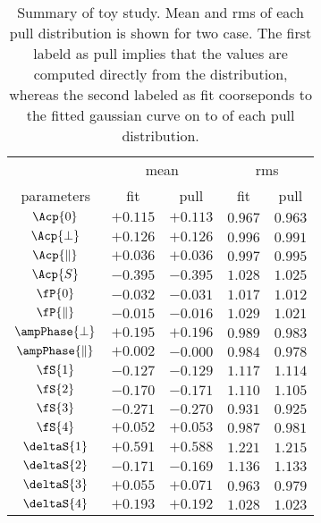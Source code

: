 \begin{table}
  \centering
  \begin{tabular}{c c c c c }
    \cline{2-5}
               & \multicolumn{2}{c}{mean} & \multicolumn{2}{c}{rms} \\
    \cline{2-5}
    parameters & fit & pull & fit & pull \\ %
    \cline{1-5}
    $\Acp{0}$              & $+0.115$ & $+0.113$ & $0.967$ & $0.963$ \\
    $\Acp{\perp}$          & $+0.126$ & $+0.126$ & $0.996$ & $0.991$ \\
    $\Acp{\parallel}$      & $+0.036$ & $+0.036$ & $0.997$ & $0.995$ \\
    $\Acp{S}$              & $-0.395$ & $-0.395$ & $1.028$ & $1.025$ \\
    \hline                                                          
    $\fP{0}$               & $-0.032$ & $-0.031$ & $1.017$ & $1.012$ \\
    $\fP{\parallel}$       & $-0.015$ & $-0.016$ & $1.029$ & $1.021$ \\
    $\ampPhase{\perp}$     & $+0.195$ & $+0.196$ & $0.989$ & $0.983$ \\
    $\ampPhase{\parallel}$ & $+0.002$ & $-0.000$ & $0.984$ & $0.978$ \\
    \hline                                                          
    $\fS{1}$               & $-0.127$ & $-0.129$ & $1.117$ & $1.114$ \\  
    $\fS{2}$               & $-0.170$ & $-0.171$ & $1.110$ & $1.105$ \\
    $\fS{3}$               & $-0.271$ & $-0.270$ & $0.931$ & $0.925$ \\
    $\fS{4}$               & $+0.052$ & $+0.053$ & $0.987$ & $0.981$ \\
    $\deltaS{1}$           & $+0.591$ & $+0.588$ & $1.221$ & $1.215$ \\
    $\deltaS{2}$           & $-0.171$ & $-0.169$ & $1.136$ & $1.133$ \\   
    $\deltaS{3}$           & $+0.055$ & $+0.071$ & $0.963$ & $0.979$ \\
    $\deltaS{4}$           & $+0.193$ & $+0.192$ & $1.028$ & $1.023$ \\   
    \hline
  \end{tabular}
  \caption{Summary of toy study. Mean and rms of each pull distribution is shown for two case.
           The first labeld as pull implies that the values are computed directly from the distribution,
           whereas the second labeled as fit coorseponds to the fitted gaussian curve on to of each pull distribution.}
  \label{pull_table}
\end{table}

